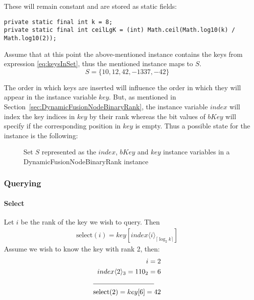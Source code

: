 These will remain constant and are stored as static fields:
\begin{lstlisting}
private static final int k = 8;
private static final int ceilLgK = (int) Math.ceil(Math.log10(k) / Math.log10(2));
\end{lstlisting}

Assume that at this point the above-mentioned instance contains the keys from expression \ref{eq:keysInSet}, thus the mentioned instance maps to $S$.
\begin{equation} \label{eq:keysInSet}
    S = \{10, 12, 42, -1337, -42 \}
\end{equation}

The order in which keys are inserted will influence the order in which they will appear in the instance variable $key$. But, as mentioned in Section~\ref{sec:DynamicFusionNodeBinaryRank}, the instance variable $index$ will index the key indices in $key$ by their rank whereas the bit values of $bKey$ will specify if the corresponding position in $key$ is empty. Thus a possible state for the instance is the following:

\begin{figure}[H]
\centering

\caption[Set $S$ represented by the state of the instance variables]{Set $S$ represented as the $index$, $bKey$ and $key$ instance variables in a {\ttfamily DynamicFusionNodeBinaryRank} instance}
\label{fig:stateOfTheInstance}
\end{figure}

\subsubsection{Querying}

\paragraph{Select}
Let $i$ be the rank of the key we wish to query. Then
\begin{align*}
\text{select}(i) = key[ index\langle i\rangle_{\lceil \log_2 k \rceil}]
\end{align*}
Assume we wish to know the key with rank 2, then:
\begin{align*}
    i = 2 \\
    index\langle 2\rangle_3 = 110_2 = 6 \\
    \cline{1-2}
    \text{select}(2) = key[6] = 42
\end{align*}

